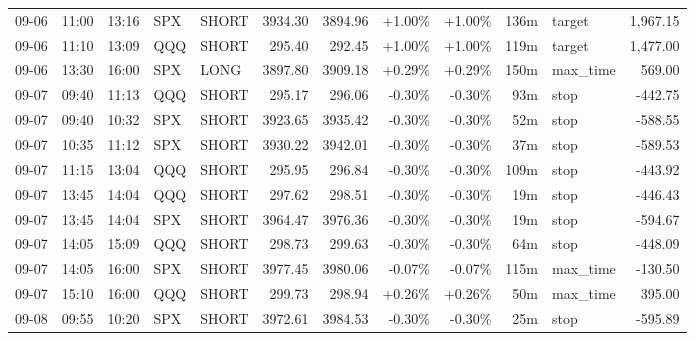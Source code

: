 \documentclass[11pt,a4paper,twoside]{article}
\begin{document}
\begin{center}
\begin{longtable}{>{\color{txtmain}}l l l l l r r r r r >{\color{txtmain}}l r}
09-06 & 11:00 & 13:16 & SPX & SHORT & 3934.30 & 3894.96 & \textcolor{wingreen}{+1.00\%} & \textcolor{wingreen}{+1.00\%} & 136m & target & \textcolor{wingreen}{1,967.15} \\
09-06 & 11:10 & 13:09 & QQQ & SHORT & 295.40 & 292.45 & \textcolor{wingreen}{+1.00\%} & \textcolor{wingreen}{+1.00\%} & 119m & target & \textcolor{wingreen}{1,477.00} \\
09-06 & 13:30 & 16:00 & SPX & LONG & 3897.80 & 3909.18 & \textcolor{wingreen}{+0.29\%} & \textcolor{wingreen}{+0.29\%} & 150m & max\_time & \textcolor{wingreen}{569.00} \\
09-07 & 09:40 & 11:13 & QQQ & SHORT & 295.17 & 296.06 & \textcolor{lossred}{-0.30\%} & \textcolor{lossred}{-0.30\%} & 93m & stop & \textcolor{lossred}{-442.75} \\
09-07 & 09:40 & 10:32 & SPX & SHORT & 3923.65 & 3935.42 & \textcolor{lossred}{-0.30\%} & \textcolor{lossred}{-0.30\%} & 52m & stop & \textcolor{lossred}{-588.55} \\
09-07 & 10:35 & 11:12 & SPX & SHORT & 3930.22 & 3942.01 & \textcolor{lossred}{-0.30\%} & \textcolor{lossred}{-0.30\%} & 37m & stop & \textcolor{lossred}{-589.53} \\
09-07 & 11:15 & 13:04 & QQQ & SHORT & 295.95 & 296.84 & \textcolor{lossred}{-0.30\%} & \textcolor{lossred}{-0.30\%} & 109m & stop & \textcolor{lossred}{-443.92} \\
09-07 & 13:45 & 14:04 & QQQ & SHORT & 297.62 & 298.51 & \textcolor{lossred}{-0.30\%} & \textcolor{lossred}{-0.30\%} & 19m & stop & \textcolor{lossred}{-446.43} \\
09-07 & 13:45 & 14:04 & SPX & SHORT & 3964.47 & 3976.36 & \textcolor{lossred}{-0.30\%} & \textcolor{lossred}{-0.30\%} & 19m & stop & \textcolor{lossred}{-594.67} \\
09-07 & 14:05 & 15:09 & QQQ & SHORT & 298.73 & 299.63 & \textcolor{lossred}{-0.30\%} & \textcolor{lossred}{-0.30\%} & 64m & stop & \textcolor{lossred}{-448.09} \\
09-07 & 14:05 & 16:00 & SPX & SHORT & 3977.45 & 3980.06 & \textcolor{lossred}{-0.07\%} & \textcolor{lossred}{-0.07\%} & 115m & max\_time & \textcolor{lossred}{-130.50} \\
09-07 & 15:10 & 16:00 & QQQ & SHORT & 299.73 & 298.94 & \textcolor{wingreen}{+0.26\%} & \textcolor{wingreen}{+0.26\%} & 50m & max\_time & \textcolor{wingreen}{395.00} \\
09-08 & 09:55 & 10:20 & SPX & SHORT & 3972.61 & 3984.53 & \textcolor{lossred}{-0.30\%} & \textcolor{lossred}{-0.30\%} & 25m & stop & \textcolor{lossred}{-595.89} \\

\end{longtable}
\end{center}
\end{document}
